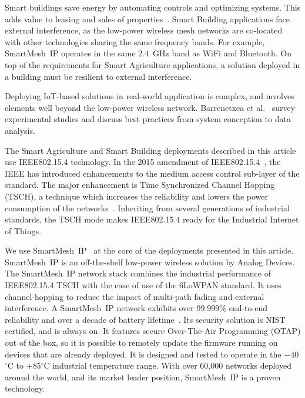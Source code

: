 \documentclass{elsarticle}
\newcommand{\smip}                {SmartMesh~IP\xspace}
\newcommand{\building}            {Smart Building\xspace}
\newcommand{\agri}                {Smart Agriculture\xspace}
\begin{document}

Smart buildings save energy by automating controls and optimizing systems.
This adds value to leasing and sales of properties~\cite{king17smart}.
\building applications face external interference, as the low-power wireless mesh networks are co-located with other technologies sharing the same frequency bands.
For example, \smip operates in the same 2.4~GHz band as WiFi and Bluetooth.
On top of the requirements for \agri applications, a solution deployed in a building must be resilient to external interference.


Deploying IoT-based solutions in real-world application is complex, and involves elements well beyond the low-power wireless network.
Barrenetxea et al.~\cite{barrenetxea08hitchhiker} survey experimental studies and discuss best practices from system conception to data analysis.


The \agri and \building deployments described in this article use IEEE802.15.4 technology.
In the 2015 amendment of IEEE802.15.4~\cite{std_ieee802154_2015}, the IEEE has introduced enhancements to the medium access control sub-layer of the standard.
The major enhancement is Time Synchronized Channel Hopping (TSCH), a technique which increases the reliability and lowers the power consumption of the networks~\cite{deguglielmo16ieee}.
Inheriting from several generations of industrial standards, the TSCH mode makes IEEE802.15.4 ready for the Industrial Internet of Things.


We use \smip~\cite{smip_app_note} at the core of the deployments presented in this article.
\smip is an off-the-shelf low-power wireless solution by Analog Devices.
The \smip network stack combines the industrial performance of IEEE802.15.4 TSCH with the ease of use of the 6LoWPAN standard.
It uses channel-hopping to reduce the impact of multi-path fading and external interference.
A \smip network exhibits over 99.999\% end-to-end reliability and over a decade of battery lifetime~\cite{watteyne10mitigating,watteyne09reliability}.
Its security solution is NIST certified, and is always on.
It features secure Over-The-Air Programming (OTAP) out of the box, so it is possible to remotely update the firmware running on devices that are already deployed.
It is designed and tested to operate in the $-$40$^{\circ}$C to $+$85$^{\circ}$C industrial temperature range.
With over 60,000 networks deployed around the world, and its market leader position, \smip is a proven technology.
\end{document}
